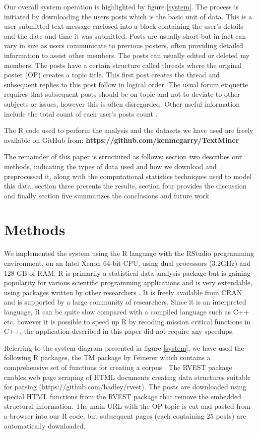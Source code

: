 \documentclass{ewic}
\begin{document}
Our overall system operation is highlighted by figure \ref{system}. The process is initiated by downloading the users posts which is the basic unit of data. This is a user-submitted text message enclosed into a block containing the user's details and the date and time it was submitted. Posts are usually short but in fact can vary in size as users communicate to previous posters, often providing detailed information to assist other members. The posts can usually edited or deleted my members. The posts have a certain structure called threads where the original poster (OP) creates a topic title. This first post creates the thread and subsequent replies to this post follow in logical order.  The usual forum etiquette requires that subsequent posts should be on-topic and not to deviate to other subjects or issues, however this is often disregarded. Other useful information include the total count of each user's posts count
 \cite{Nahm02}.


The R code used to perform the analysis and the datasets we have used are freely available on GitHub from: {\bf https://github.com/kenmcgarry/TextMiner}

The remainder of this paper is structured as follows; section two describes our methods, indicating the types of  data used and how we download and preprocessed it, along with the  computational statistics techniques used to model this data, section three presents the results, section four provides the discussion and finally section five summarizes the conclusions and future work.


\section{Methods}
We implemented the system using the R language with the RStudio programming environment, on an Intel Xenon 64-bit CPU, using dual processors (3.2GHz) and 128 GB of RAM. R is primarily a statistical data analysis package but is gaining popularity for various scientific programming applications and is very extendable, using packages written by other researchers \cite{RUser}.  It is freely available from CRAN and is supported by a large community of researchers. Since it is an interpreted language, R can be quite slow compared with a compiled language such as C++ etc, however it is possible to speed up R by recoding mission critical functions in C++, the application described in this paper did not require any speedups.

Referring to the system diagram presented in figure \ref{system}, we have used the following R packages, the TM package by Feinerer which contains a comprehensive set of functions for creating a corpus \cite{Feinerer2008}. The RVEST package enables web page scraping of HTML documents creating data structures suitable for parsing (https://github.com/hadley/rvest). The posts are downloaded using special HTML functions from the RVEST package that remove the embedded structural information. The main URL with the OP topic is cut and pasted from a browser into our R code, but subsequent pages (each containing 25 posts) are automatically downloaded.
\end{document}
